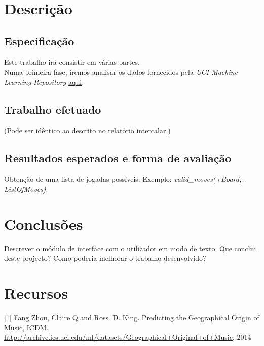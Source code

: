 \documentclass[a4paper]{article}
\begin{document}
\section{Descrição}

\subsection{Especificação} Este trabalho irá consistir em várias partes. 
\\Numa primeira fase, iremos analisar os dados fornecidos  pela \textit{UCI Machine Learning Repository} \href{http://tinyurl.com/qcxjzap}{aqui}.

\subsection{Trabalho efetuado} (Pode ser idêntico ao descrito no relatório intercalar.)

\subsection{Resultados esperados e forma de avaliação} Obtenção de uma lista de jogadas possíveis. Exemplo: \textit{valid\_moves(+Board, -ListOfMoves)}.


\section{Conclusões}

Descrever o módulo de interface com o utilizador em modo de texto.
Que conclui deste projecto? Como poderia melhorar o trabalho desenvolvido?

\section{Recursos}

[1] Fang Zhou, Claire Q and Ross. D. King. Predicting the Geographical Origin of Music, ICDM.
\url{http://archive.ics.uci.edu/ml/datasets/Geographical+Original+of+Music}, 2014

\clearpage
\end{document}
